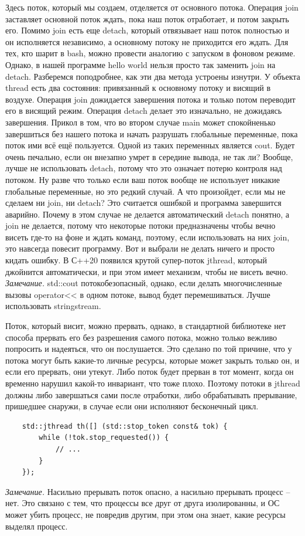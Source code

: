 \documentclass[12pt, a4paper]{article}
\begin{document}
Здесь поток, который мы создаем, отделяется от основного потока. Операция join заставляет основной поток ждать, пока наш поток отработает, и потом закрыть его. Помимо join есть еще detach, который отвязывает наш поток полностью и он исполняется независимо, а основному потоку не приходится его ждать. Для тех, кто шарит в bash, можно провести аналогию с запуском в фоновом режиме. Однако, в нашей программе hello world нельзя просто так заменить join на detach. Разберемся поподробнее, как эти два метода устроены изнутри. У объекта thread есть два состояния: привязанный к основному потоку и висящий в воздухе. Операция join дожидается завершения потока и только потом переводит его в висящий режим. Операция detach делает это изначально, не дожидаясь завершения. Прикол в том, что во втором случае main может спокойненько завершиться без нашего потока и начать разрушать глобальные переменные, пока поток ими всё ещё пользуется. Одной из таких переменных является cout. Будет очень печально, если он внезапно умрет в середине вывода, не так ли? Вообще, лучше не использовать detach, потому что это означает потерю контроля над потоком. Ну разве что только если ваш поток вообще не использует никакие глобальные переменные, но это редкий случай. А что произойдет, если мы не сделаем ни join, ни detach? Это считается ошибкой и программа завершится аварийно. Почему в этом случае не делается автоматический detach понятно, а join не делается, потому что некоторые потоки предназначены чтобы вечно висеть где-то на фоне и ждать команд, поэтому, если использовать на них join, это навсегда повесит программу. Вот и выбрали не делать ничего и просто кидать ошибку. В С++20 появился крутой супер-поток jthread, который джойнится автоматически, и при этом имеет механизм, чтобы не висеть вечно.\\
\textit{Замечание.} std::cout потокобезопасный, однако, если делать многочисленные вызовы operator<< в одном потоке, вывод будет перемешиваться. Лучше использовать stringstream.\\
\par Поток, который висит, можно прервать, однако, в стандартной библиотеке нет способа прервать его без разрешения самого потока, можно только вежливо попросить и надеяться, что он послушается. Это сделано по той причине, что у потока могут быть какие-то личные ресурсы, которые может закрыть только он, и если его прервать, они утекут. Либо поток будет прерван в тот момент, когда он временно нарушил какой-то инвариант, что тоже плохо. Поэтому потоки в jthread должны либо завершаться сами после отработки, либо обрабатывать прерывание, пришедшее снаружи, в случае если они исполняют бесконечный цикл.
\begin{verbatim}
	std::jthread th([] (std::stop_token const& tok) {
		while (!tok.stop_requested()) {
			// ...
		}
	});
\end{verbatim}
\textit{Замечание.} Насильно прерывать поток опасно, а насильно прерывать процесс -- нет. Это связано с тем, что процессы все друг от друга изолированны, и ОС может убить процесс, не повредив другим, при этом она знает, какие ресурсы выделял процесс.
\end{document}
